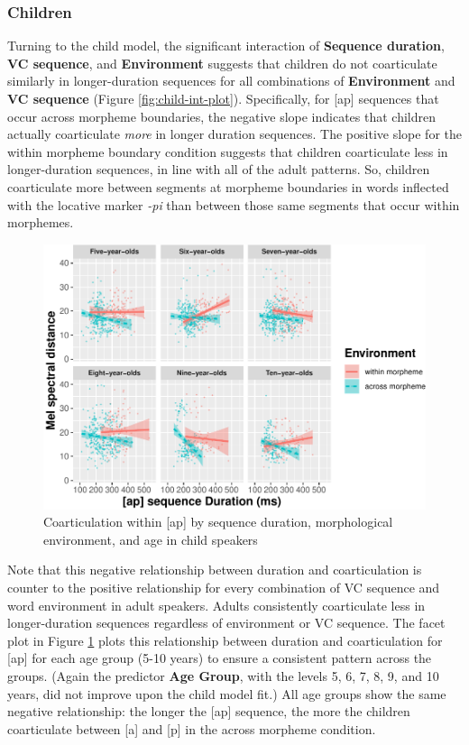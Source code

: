 \documentclass[
]{article}
\begin{document}
\hypertarget{children}{%
\subsubsection{Children}\label{children}}

Turning to the child model, the significant interaction of \textbf{Sequence duration}, \textbf{VC sequence}, and \textbf{Environment} suggests that children do not coarticulate similarly in longer-duration sequences for all combinations of \textbf{Environment} and \textbf{VC sequence} (Figure \ref{fig:child-int-plot}). Specifically, for {[}ap{]} sequences that occur across morpheme boundaries, the negative slope indicates that children actually coarticulate \emph{more} in longer duration sequences. The positive slope for the within morpheme boundary condition suggests that children coarticulate less in longer-duration sequences, in line with all of the adult patterns. So, children coarticulate more between segments at morpheme boundaries in words inflected with the locative marker \emph{-pi} than between those same segments that occur within morphemes.

\begin{figure}
\centering
\includegraphics{3_ch3_results_files/figure-latex/child-facet-ap-1.pdf}
\caption{\label{fig:child-facet-ap}Coarticulation within {[}ap{]} by sequence duration, morphological environment, and age in child speakers}
\end{figure}

Note that this negative relationship between duration and coarticulation is counter to the positive relationship for every combination of VC sequence and word environment in adult speakers. Adults consistently coarticulate less in longer-duration sequences regardless of environment or VC sequence. The facet plot in Figure \ref{fig:child-facet-ap} plots this relationship between duration and coarticulation for {[}ap{]} for each age group (5-10 years) to ensure a consistent pattern across the groups. (Again the predictor \textbf{Age Group}, with the levels 5, 6, 7, 8, 9, and 10 years, did not improve upon the child model fit.) All age groups show the same negative relationship: the longer the {[}ap{]} sequence, the more the children coarticulate between {[}a{]} and {[}p{]} in the across morpheme condition.
\end{document}
